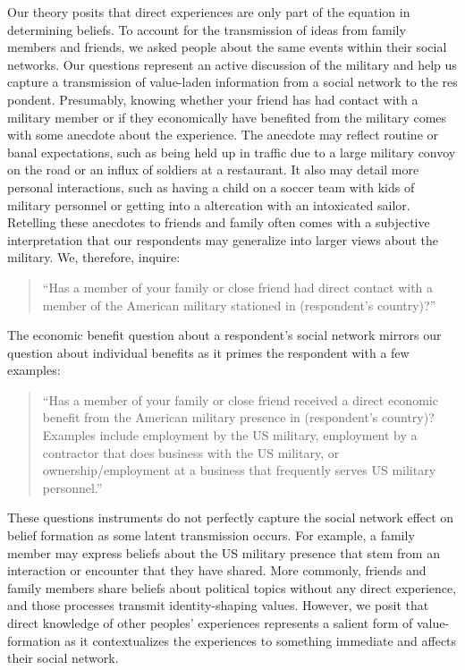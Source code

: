 Our theory posits that direct experiences are only part of the equation in determining beliefs. To account for the transmission of ideas from family members and friends, we asked people about the same events within their social networks. Our questions represent an active discussion of the military and help us capture a transmission of value-laden information from a social network to the res
pondent. Presumably, knowing whether your friend has had contact with a military member or if they economically  have benefited from the military comes with some anecdote about the experience. The anecdote may reflect routine or banal expectations, such as being held up in traffic due to a large military convoy on the road or an influx of soldiers at a restaurant. It also may detail more personal interactions, such as having a child on a soccer team with kids of military personnel or getting into a altercation with an intoxicated sailor. Retelling these anecdotes to friends and family often comes with a subjective interpretation that our respondents may generalize into larger views about the military. We, therefore, inquire:

\begin{quote}
	``Has a member of your family or close friend had direct contact with a member of the American military stationed in (respondent's country)?''
\end{quote}

The economic benefit question about a respondent's social network mirrors our question about individual benefits as it primes the respondent with a few examples:


\begin{quote}
	``Has a member of your family or close friend received a direct economic benefit from the American military presence in (respondent's country)? Examples include employment by the US military, employment by a contractor that does business with the US military, or ownership/employment at a business that frequently serves US military personnel.''
\end{quote}

These questions instruments do not perfectly capture the social network effect on belief formation as some latent transmission occurs. For example, a family member may express beliefs about the US military presence that stem from an interaction or encounter that they have shared. More commonly, friends and family members share beliefs about political topics without any direct experience, and those processes transmit identity-shaping values. However, we posit that direct knowledge of other peoples' experiences represents a salient form of value-formation as it contextualizes the experiences to something immediate and affects their social network. 

